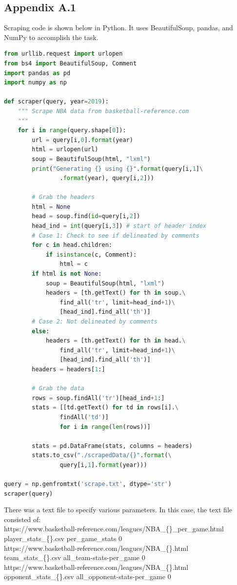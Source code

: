 \documentclass[12pt]{article}%
\begin{document}
\subsection{Appendix A.1}
Scraping code is shown below in Python. It uses BeautifulSoup, pandas, and NumPy to accomplish the task.
\noindent\hrulefill
\begin{lstlisting}[language=Python]
from urllib.request import urlopen
from bs4 import BeautifulSoup, Comment
import pandas as pd
import numpy as np

def scraper(query, year=2019):
	""" Scrape NBA data from basketball-reference.com
	"""
	for i in range(query.shape[0]):
		url = query[i,0].format(year)
		html = urlopen(url)
		soup = BeautifulSoup(html, "lxml")
		print("Generating {} using {}".format(query[i,1]\
				.format(year), query[i,2]))

		# Grab the headers
		html = None
		head = soup.find(id=query[i,2])
		head_ind = int(query[i,3]) # start of header index
		# Case 1: Check to see if delineated by comments
		for c in head.children:
			if isinstance(c, Comment):
				html = c
		if html is not None:
			soup = BeautifulSoup(html, "lxml")
			headers = [th.getText() for th in soup.\
				find_all('tr', limit=head_ind+1)\
				[head_ind].find_all('th')]
		# Case 2: Not delineated by comments
		else:
			headers = [th.getText() for th in head.\
				find_all('tr', limit=head_ind+1)\
				[head_ind].find_all('th')]
		headers = headers[1:]

		# Grab the data
		rows = soup.findAll('tr')[head_ind+1:]
		stats = [[td.getText() for td in rows[i].\
				findAll('td')]
		        for i in range(len(rows))]

		stats = pd.DataFrame(stats, columns = headers)
		stats.to_csv("./scrapedData/{}".format(\
				query[i,1].format(year)))

query = np.genfromtxt('scrape.txt', dtype='str')
scraper(query)
\end{lstlisting}
There was a text file to specify various parameters. In this case, the text file consisted of:\\
https://www.basketball-reference.com/leagues/NBA\_\{\}\_per\_game.html\\ player\_stats\_\{\}.csv per\_game\_stats 0\\
https://www.basketball-reference.com/leagues/NBA\_\{\}.html \\team\_stats\_\{\}.csv all\_team-stats-per\_game 0\\
https://www.basketball-reference.com/leagues/NBA\_\{\}.html \\opponent\_stats\_\{\}.csv all\_opponent-stats-per\_game 0\\
\end{document}
